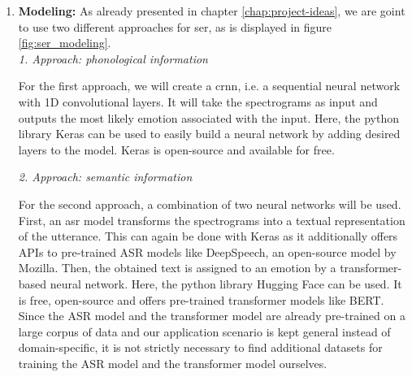 \begin{enumerate}
\item \textbf{Modeling:} As already presented in chapter \ref{chap:project-ideas}, we are goint to use two different approaches for \acrshort{ser}, as is displayed in figure \ref{fig:ser_modeling}.\\
\emph{1. Approach: phonological information}

For the first approach, we will create a \acrfull{crnn},  i.e. a sequential neural network with 1D convolutional layers. It will take the spectrograms as input and outputs the most likely emotion associated with the input. Here, the python library Keras can be used to easily build a neural network by adding desired layers to the model. Keras is open-source and available for free. 

\emph{2. Approach: semantic information}

For the second approach, a combination of two neural networks will be used. First, an \acrfull{asr} model transforms the spectrograms into a textual representation of the utterance. This can again be done with Keras as it additionally offers APIs to pre-trained ASR models like DeepSpeech, an open-source model by Mozilla.
Then, the obtained text is assigned to an emotion by a transformer-based neural network. Here, the python library Hugging Face can be used. It is free, open-source and offers pre-trained transformer models like BERT. 
Since the ASR model and the transformer model are already pre-trained on a large corpus of data and our application scenario is kept general instead of domain-specific, it is not strictly necessary to find additional datasets for training the ASR model and the transformer model ourselves. \\


\end{enumerate}
